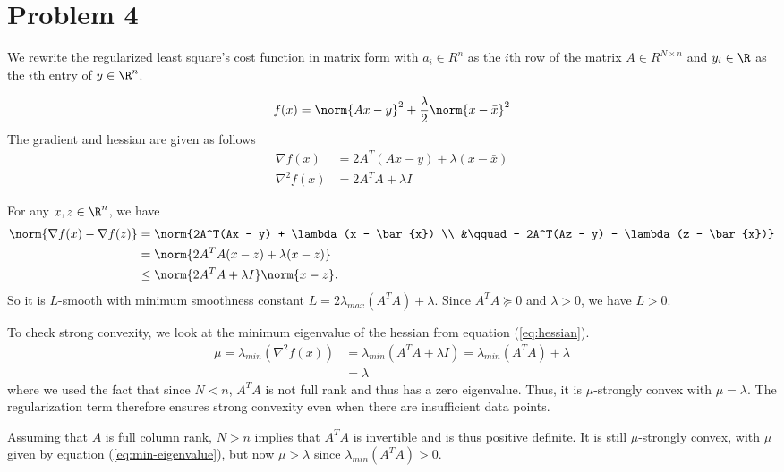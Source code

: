 \documentclass{homework}
\begin{document}
\section{Problem 4}
We rewrite the regularized least square's cost function in matrix form with
$a_i \in R^n$ as the $i$th row of the matrix $A \in R^{N \times n}$ and 
$y_i \in \R$ as the $i$th entry of $y \in \R^n$.

\begin{equation}
    f(x) = \norm{Ax - y}^2 + \frac{\lambda}{2} \norm{x - \bar{x}}^2
\end{equation}
The gradient and hessian are given as follows
\begin{align}
    \nabla f(x) &= 2A^T(Ax - y) + \lambda(x - \bar{x}) \label{eq:gradient} \\
    \nabla^2 f(x) &= 2A^TA + \lambda I \label{eq:hessian}
\end{align}

\begin{letterenum}
    \item For any $x,z \in \R^n$, we have
    \begin{align*}
        \norm{\nabla f(x) - \nabla f(z)} &=
            \norm{2A^T(Ax - y) + \lambda (x - \bar{x}) \\
        &\qquad - 2A^T(Az - y) - \lambda (z - \bar{x})} \\
        &= \norm{2A^TA (x - z) + \lambda (x - z)} \\
        &\leq \norm{2A^TA + \lambda I} \norm{x - z}.
    \end{align*}
    So it is $L$-smooth with minimum smoothness constant
    $L = 2\lambda_{max}(A^TA) + \lambda$. Since $A^TA \succeq 0$ and $\lambda > 0$,
    we have $L > 0$.

    \item To check strong convexity, we look at the minimum eigenvalue of the hessian
    from equation (\ref{eq:hessian}).
    \begin{align}
        \mu = \lambda_{min}(\nabla^2 f(x)) &= \lambda_{min}(A^TA + \lambda I) = \lambda_{min}(A^TA) + \lambda
            \label{eq:min-eigenvalue} \\
            &=  \lambda
    \end{align}
    where we used the fact that since $N < n$, $A^TA$ is not full rank and thus
    has a zero eigenvalue. Thus, it is $\mu$-strongly convex with $\mu=\lambda$.
    The regularization term therefore ensures strong convexity even when
    there are insufficient data points.

    \item Assuming that $A$ is full column rank, $N > n$ implies that $A^TA$
    is invertible and is thus positive definite. It is still $\mu$-strongly
    convex, with $\mu$ given by equation (\ref{eq:min-eigenvalue}), but now
     $\mu > \lambda$ since $\lambda_{min}(A^TA) > 0$.
\end{letterenum}
\end{document}
